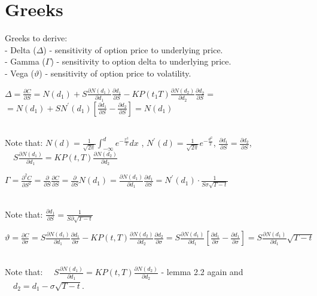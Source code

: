 \documentclass{article}
\begin{document}
\section{Greeks}
     \item Greeks to derive:
          \\[0.3cm]  - Delta ($\Delta$) - sensitivity of option price to underlying price.
          \\[0.3cm]   - Gamma ($\Gamma$) - sensitivity to option delta to underlying price.
          \\[0.3cm]   - Vega ($\vartheta$) - sensitivity of option price to volatility.



\begin{center}   
$\Delta=\frac{\partial C}{\partial S}=N\left(d_1\right)+S \frac{\partial N\left(d_1\right)}{\partial d_1} \frac{\partial d_1}{\partial S}-K P\left(t_1 T\right) \frac{\partial N\left(d_2\right)}{\partial d_2} \frac{\partial d_2}{\partial S}=$
\\[0.2cm]
$=N\left(d_1\right)+S N^{\prime}\left(d_1\right)\left[\frac{\partial d_1}{\partial S}-\frac{\partial d_2}{\partial S}\right]=N\left(d_1\right)$
\end{center}


        \\[0.3cm]   Note that: $N(d)=\frac{1}{\sqrt{2 \pi}} \int_{-\infty}^d e^{-\frac{x^2}{2}} d x$ ,  
        $N^{\prime}(d)=\frac{1}{\sqrt{2 \pi}} e^{-\frac{d^2}{2}}$,    
        $\frac{\partial d_1}{\partial S}=\frac{\partial d_2}{\partial S}$,  
        $\quad S \frac{\partial N\left(d_1\right)}{\partial d_1}=K P(t, T)\frac{\partial N\left(d_2\right)}{\partial d_2}$





\begin{center}   
$\Gamma =\frac{\partial^2 C}{\partial S^2}=\frac{\partial}{\partial S} \frac{\partial C}{\partial S}=\frac{\partial}{\partial S} N\left(d_1\right)=\frac{\partial N\left(d_1\right)}{\partial d_1} \frac{\partial d_1}{\partial S} =N^{\prime}\left(d_1\right) \cdot \frac{1}{S \sigma \sqrt{T-t}}$
\end{center}

        \\[0.3cm]   Note that: $\frac{\partial d_1}{\partial S}=\frac{1}{S \partial \sqrt{T-t}}$
        \\[0.1cm]
        
\begin{center}   
$\vartheta=\frac{\partial C}{\partial \sigma}=S \frac{\partial N\left(d_1\right)}{\partial d_1} \frac{\partial d_1}{\partial \sigma}-K P(t, T) \frac{\partial N(d_2)}{\partial d_2} \frac{\partial d_2}{\partial \sigma} =S \frac{\partial N\left(d_1\right)}{\partial d_1}\left[\frac{\partial d_1}{\partial \sigma}-\frac{\partial d_1}{\partial \sigma}\right]=S \frac{\partial N\left(d_1\right)}{\partial d_1} \sqrt{T-t}$
\end{center}
     
        \\[0.3cm]       Note that: $\quad S \frac{\partial N\left(d_1\right)}{\partial d_1}=K P(t, T)\frac{\partial N\left(d_2\right)}{\partial d_2}$ - lemma 2.2  again and $\quad d_2=d_1-\sigma \sqrt{T-t}$.
\end{document}
